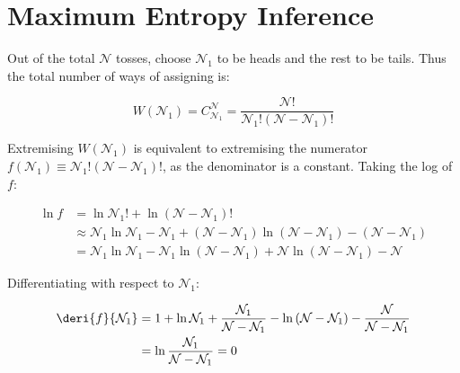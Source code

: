 \documentclass[12pt]{article}
\begin{document}



\pagebreak
\section*{Maximum Entropy Inference}



Out of the total $\mathcal{N}$ tosses, choose $\mathcal{N}_1$ to be heads and the rest to be tails. Thus the total number of ways of assigning is:

\begin{equation}
W(\mathcal{N}_{1}) = C_{\mathcal{N}_{1}}^{\mathcal{N}} = \frac{\mathcal{N}!}{\mathcal{N}_{1}!(\mathcal{N} - \mathcal{N}_{1})!}
\end{equation}

Extremising $W(\mathcal{N}_{1})$ is equivalent to extremising the numerator $f(\mathcal{N}_{1}) \equiv \mathcal{N}_{1}!(\mathcal{N} - \mathcal{N}_{1})!$, as the denominator is a constant. Taking the log of $f$:

\begin{equation}
\begin{split}
\ln{f} &= \ln{\mathcal{N}_{1}!} + \ln{(\mathcal{N} - \mathcal{N}_{1})!} \\
       &\approx \mathcal{N}_{1} \ln{\mathcal{N}_{1}} - \mathcal{N}_{1} + (\mathcal{N} - \mathcal{N}_{1}) \ln{(\mathcal{N} - \mathcal{N}_{1})} - (\mathcal{N} - \mathcal{N}_{1}) \\
       &= \mathcal{N}_{1} \ln{\mathcal{N}_{1}} - \mathcal{N}_{1} \ln{(\mathcal{N} - \mathcal{N}_{1})} + \mathcal{N} \ln{(\mathcal{N} - \mathcal{N}_{1})} - \mathcal{N}
\end{split}
\end{equation}

Differentiating with respect to $\mathcal{N}_{1}$:

\begin{equation}
\begin{split}
\deri{f}{\mathcal{N}_{1}} &= 1 + \ln{\mathcal{N}_{1}} + \frac{\mathcal{N}_{1}}{\mathcal{N} - \mathcal{N}_{1}} - \ln{(\mathcal{N} - \mathcal{N}_{1})} - \frac{\mathcal{N}}{\mathcal{N} - \mathcal{N}_{1}} \\
                          &= \ln{\frac{\mathcal{N}_{1}}{\mathcal{N} - \mathcal{N}_{1}}} = 0
\end{split}
\end{equation}
\end{document}
